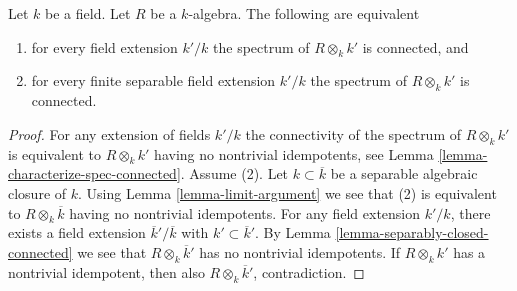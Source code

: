 \begin{lemma}
\label{lemma-geometrically-connected}
Let $k$ be a field.
Let $R$ be a $k$-algebra.
The following are equivalent
\begin{enumerate}
\item for every field extension $k'/k$ the
spectrum of $R \otimes_k k'$ is connected, and
\item for every finite separable field extension $k'/k$ the
spectrum of $R \otimes_k k'$ is connected.
\end{enumerate}
\end{lemma}

\begin{proof}
For any extension of fields $k'/k$ the connectivity
of the spectrum of $R \otimes_k k'$ is equivalent to $R \otimes_k k'$
having no nontrivial idempotents, see
Lemma \ref{lemma-characterize-spec-connected}. Assume (2).
Let $k \subset \overline{k}$ be a separable algebraic closure of $k$.
Using Lemma \ref{lemma-limit-argument}
we see that (2) is equivalent to $R \otimes_k \overline{k}$
having no nontrivial idempotents.
For any field extension $k'/k$, there exists a field
extension $\overline{k}'/\overline{k}$ with
$k' \subset \overline{k}'$. By Lemma \ref{lemma-separably-closed-connected}
we see that $R \otimes_k \overline{k}'$ has no nontrivial idempotents.
If $R \otimes_k k'$ has a nontrivial idempotent,
then also $R \otimes_k \overline{k}'$, contradiction.
\end{proof}